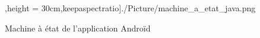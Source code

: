 \documentclass[11pt,a4paper]{report} %
\begin{document}
\begin{figure}[H]
,height = 30cm,keepaspectratio]{./Picture/machine_a_etat_java.png}
			\caption{Machine à état de l'application Androïd} 
			\label{diagClass}
		\end{figure}
		\newpage
		
\end{document}
